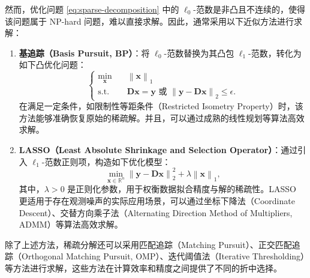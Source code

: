 然而，优化问题 \cref{eq:sparse-decomposition} 中的 \( \ell_0 \)-范数是非凸且不连续的，使得该问题属于 NP-hard 问题，难以直接求解。因此，通常采用以下近似方法进行求解：

\begin{enumerate}[label=\arabic*.]
    \item \textbf{基追踪（Basis Pursuit, BP）}：将 \( \ell_0 \)-范数替换为其凸包 \( \ell_1 \)-范数，转化为如下凸优化问题：
          \begin{equation}
              \begin{cases}
                  \min_{\bm{x}} \quad & \left\| \bm{x} \right\|_1                                                                          \\
                  \text{s.t.} \quad   & \mathbf{D} \bm{x} = \bm{y} \text{ 或 } \left\| \bm{y} - \mathbf{D} \bm{x} \right\|_2 \leq \epsilon.
              \end{cases}
              \label{eq:basis-pursuit}
          \end{equation}
          在满足一定条件，如限制性等距条件（Restricted Isometry Property）时，该方法能够准确恢复原始的稀疏解。并且，可以通过成熟的线性规划等算法高效求解。

    \item \textbf{LASSO（Least Absolute Shrinkage and Selection Operator）}：通过引入 \( \ell_1 \)-范数正则项，构造如下优化模型：
          \begin{equation}
              \min_{\bm{x} \in \mathbb{R}^n} \left\| \bm{y} - \mathbf{D} \bm{x} \right\|_2^2 + \lambda \left\| \bm{x} \right\|_1,
              \label{eq:lasso}
          \end{equation}
          其中，\( \lambda > 0 \) 是正则化参数，用于权衡数据拟合精度与解的稀疏性。LASSO 更适用于存在观测噪声的实际应用场景，可以通过坐标下降法（Coordinate Descent）、交替方向乘子法（Alternating Direction Method of Multipliers, ADMM）等算法高效求解。
\end{enumerate}

除了上述方法，稀疏分解还可以采用匹配追踪（Matching Pursuit）、正交匹配追踪（Orthogonal Matching Pursuit, OMP）、迭代阈值法（Iterative Thresholding）等方法进行求解，这些方法在计算效率和精度之间提供了不同的折中选择。

